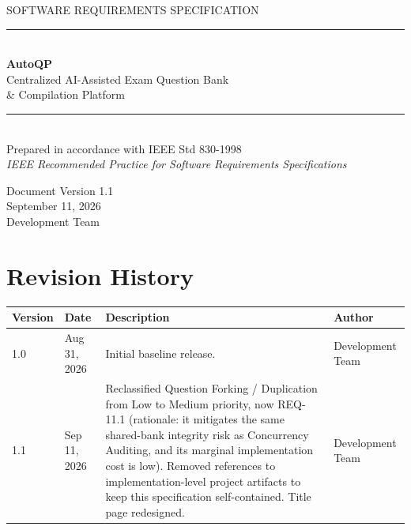 \documentclass[11pt]{article}
\begin{document}
\begin{titlepage}
\thispagestyle{empty}
\begin{center}
\vspace*{2.2cm}

{\small\color{srsgray}\MakeUppercase{Software Requirements Specification}}\\[0.35cm]
{\color{srsgray}\rule{0.42\linewidth}{0.4pt}}\\[1.4cm]

{\Huge\bfseries AutoQP}\\[0.5cm]
{\Large Centralized AI-Assisted Exam Question Bank\\ \& Compilation Platform}\\[1.8cm]

{\color{srsgray}\rule{0.6\linewidth}{0.4pt}}\\[1cm]

{\normalsize Prepared in accordance with IEEE Std 830-1998}\\[0.15cm]
{\normalsize\emph{IEEE Recommended Practice for Software Requirements Specifications}}

\vfill

{\normalsize Document Version 1.1}\\[0.15cm]
{\normalsize September 11, 2026}\\[0.5cm]
{\normalsize Development Team}

\vspace*{1.8cm}
\end{center}
\end{titlepage}

\thispagestyle{empty}
\section*{Revision History}

\begin{longtable}{@{}p{1.6cm}p{2.6cm}p{7.6cm}p{2.6cm}@{}}
\toprule
\textbf{Version} & \textbf{Date} & \textbf{Description} & \textbf{Author} \\
\midrule
\endhead
1.0 & Aug 31, 2026 & Initial baseline release. & Development Team \\[4pt]
1.1 & Sep 11, 2026 & Reclassified Question Forking / Duplication from Low
  to Medium priority, now REQ-11.1 (rationale: it mitigates the same
  shared-bank integrity risk as Concurrency Auditing, and its marginal
  implementation cost is low). Removed references to implementation-level
  project artifacts to keep this specification self-contained. Title page
  redesigned. & Development Team \\
\bottomrule
\end{longtable}
\end{document}
